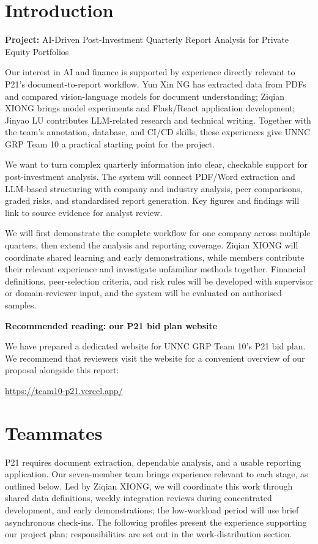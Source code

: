 \documentclass[a4paper,12pt]{article}
\title{\BidTitle}
\author{\BidTeam}
\date{\BidDate}
\newcommand{\BidProjectName}{AI-Driven Post-Investment Quarterly Report Analysis for Private Equity Portfolios}
\begin{document}
\maketitle
\thispagestyle{plain}
\tableofcontents
\newpage

\section{Introduction}
\noindent\textbf{Project:} \BidProjectName
\par\medskip
Our interest in AI and finance is supported by experience directly relevant to P21's document-to-report workflow. Yun Xin NG has extracted data from PDFs and compared vision-language models for document understanding; Ziqian XIONG brings model experiments and Flask/React application development; Jinyao LU contributes LLM-related research and technical writing. Together with the team's annotation, database, and CI/CD skills, these experiences give UNNC GRP Team 10 a practical starting point for the project.

We want to turn complex quarterly information into clear, checkable support for post-investment analysis. The system will connect PDF/Word extraction and LLM-based structuring with company and industry analysis, peer comparisons, graded risks, and standardised report generation. Key figures and findings will link to source evidence for analyst review.

We will first demonstrate the complete workflow for one company across multiple quarters, then extend the analysis and reporting coverage. Ziqian XIONG will coordinate shared learning and early demonstrations, while members contribute their relevant experience and investigate unfamiliar methods together. Financial definitions, peer-selection criteria, and risk rules will be developed with supervisor or domain-reviewer input, and the system will be evaluated on authorised samples.

\medskip
\noindent\textbf{Recommended reading: our P21 bid plan website}\par
We have prepared a dedicated website for UNNC GRP Team 10's P21 bid plan. We recommend that reviewers visit the website for a convenient overview of our proposal alongside this report:\par
\noindent\url{https://team10-p21.vercel.app/}

\newpage
\section{Teammates}
P21 requires document extraction, dependable analysis, and a usable reporting application. Our seven-member team brings experience relevant to each stage, as outlined below. Led by Ziqian XIONG, we will coordinate this work through shared data definitions, weekly integration reviews during concentrated development, and early demonstrations; the low-workload period will use brief asynchronous check-ins. The following profiles present the experience supporting our project plan; responsibilities are set out in the work-distribution section.
\end{document}
